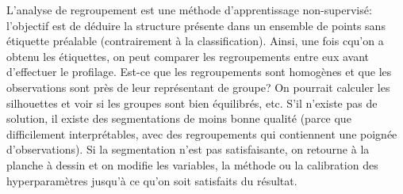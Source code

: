 \documentclass[
  11pt,
  letterpaper,
]{book}
\theoremstyle{definition}
\theoremstyle{remark}
\begin{document}
L'analyse de regroupement est une méthode d'apprentissage non-supervisé:
l'objectif est de déduire la structure présente dans un ensemble de
points sans étiquette préalable (contrairement à la classification).
Ainsi, une fois cqu'on a obtenu les étiquettes, on peut comparer les
regroupements entre eux avant d'effectuer le profilage. Est-ce que les
regroupements sont homogènes et que les observations sont près de leur
représentant de groupe? On pourrait calculer les silhouettes et voir si
les groupes sont bien équilibrés, etc. S'il n'existe pas de solution, il
existe des segmentations de moins bonne qualité (parce que difficilement
interprétables, avec des regroupements qui contiennent une poignée
d'observations). Si la segmentation n'est pas satisfaisante, on retourne
à la planche à dessin et on modifie les variables, la méthode ou la
calibration des hyperparamètres jusqu'à ce qu'on soit satisfaits du
résultat.
\end{document}

